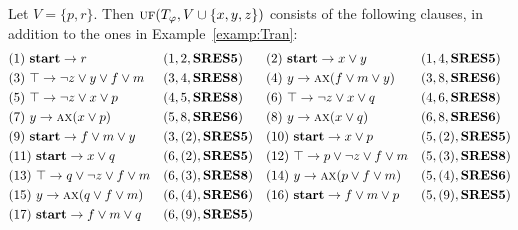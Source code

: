 \documentclass[twoside,11pt]{article}
\begin{document}
\begin{example}\label{examp:Res}
 Let $V=\{p,r\}$. Then $\textsc{uf}(T_\varphi, V\cup \{x,y,z\})$ consists of the following clauses, in addition to the ones in Example~\ref{examp:Tran}:
	\begin{align*}
		&(1)\ \textbf{start} \rightarrow r && (1,2,\textbf{SRES5})
		&&(2)\ \textbf{start} \rightarrow x \vee y && (1,4,\textbf{SRES5})\\
		&(3)\ \top \rightarrow \neg z \vee y \vee f \vee m && (3, 4, \textbf{SRES8})
		&&(4)\ y \rightarrow \textsc{a}\textsc{x}(f\vee m\vee y) && (3,8, \textbf{SRES6})\\
		&(5)\ \top \rightarrow \neg z \vee x \vee p && (4,5, \textbf{SRES8})
		&&(6)\ \top \rightarrow \neg z \vee x \vee q && (4,6, \textbf{SRES8})\\
		&(7)\ y \rightarrow \textsc{a}\textsc{x}(x\vee p) && (5, 8, \textbf{SRES6})
		&&(8)\ y \rightarrow \textsc{a}\textsc{x}(x\vee q) && (6, 8, \textbf{SRES6})\\
		&(9)\ \textbf{start} \rightarrow f\vee m \vee y && (3,(2), \textbf{SRES5})
		&&(10)\ \textbf{start} \rightarrow x \vee p && (5,(2),\textbf{SRES5}) \\
		&(11)\ \textbf{start} \rightarrow x \vee q && (6,(2), \textbf{SRES5})
		&& (12)\ \top \rightarrow p \vee \neg z \vee f \vee m && (5,(3), \textbf{SRES8})\\
		& (13)\ \top \rightarrow q \vee \neg z \vee f \vee m && (6,(3), \textbf{SRES8})
		&&(14)\ y \rightarrow \textsc{a}\textsc{x}(p \vee f\vee m) && (5, (4), \textbf{SRES6})\\
		&(15)\ y \rightarrow \textsc{a}\textsc{x}(q \vee f\vee m) && (6, (4), \textbf{SRES6})
		&&(16)\ \textbf{start} \rightarrow f\vee m \vee p && (5, (9), \textbf{SRES5}) \\
		&(17)\ \textbf{start} \rightarrow f\vee m \vee q && (6, (9), \textbf{SRES5})
	\end{align*}


\end{example}
\end{document}
